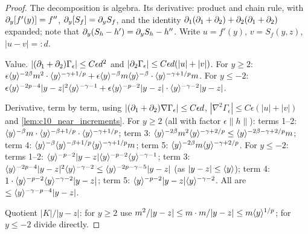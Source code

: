 \begin{proof}
  The decomposition is algebra. Its derivative: product and chain rule, with $\partial_y[f'(y)]=f''$,
  $\partial_y[S_f]=\partial_yS_f$, and the identity $\partial_1(\partial_1+\partial_2)+\partial_2(\partial_1+\partial_2)$ expanded; note that
  $\partial_y(S_h-h')=\partial_yS_h-h''$. Write $u=f'(y)$, $v=S_f(y,z)$, $|u-v|=:d$.

  Value. $|(\partial_1+\partial_2)\Gamma_\epsilon|\le C\epsilon d^2$ and $|\partial_2\Gamma_\epsilon|\le C\epsilon d(|u|+|v|)$. For
  $y\ge2$: $\epsilon\langle y \rangle^{-2\beta}m^2\cdot\langle y \rangle^{-\gamma+1/p}+\epsilon\langle y \rangle^{-\beta}m\langle y \rangle^{-\beta}\cdot
  \langle y \rangle^{-\gamma+1/p}m$. For $y\le-2$: $\epsilon\langle y \rangle^{-2p-4}|y-z|^2\langle y \rangle^{-\gamma-1}+\epsilon
  \langle y \rangle^{-p-2}|y-z|\cdot\langle y \rangle^{-\gamma-2}|y-z|$.

  Derivative, term by term, using $|(\partial_1+\partial_2)\nabla\Gamma_\epsilon|\le C\epsilon d$,
  $|\nabla^2\Gamma_\epsilon|\le C\epsilon(|u|+|v|)$ and \cref{lem:c10_near_increments}. For $y\ge2$ (all with
  factor $\epsilon\|h\|$): terms 1--2: $\langle y \rangle^{-\beta}m\cdot\langle y \rangle^{-\beta+1/p}\cdot\langle y \rangle^{-\gamma+1/p}$;
  term 3: $\langle y \rangle^{-2\beta}m^2\langle y \rangle^{-\gamma+2/p}\le\langle y \rangle^{-2\beta-\gamma+2/p}m$; term 4:
  $\langle y \rangle^{-\beta}\langle y \rangle^{-\beta+1/p}\langle y \rangle^{-\gamma+1/p}m$; term 5:
  $\langle y \rangle^{-2\beta}m\langle y \rangle^{-\gamma+2/p}$. For $y\le-2$: terms 1--2:
  $\langle y \rangle^{-p-2}|y-z|\langle y \rangle^{-p-2}\langle y \rangle^{-\gamma-1}$; term 3: $\langle y \rangle^{-2p-4}|y-z|^2\langle y \rangle^{-\gamma-2}
  \le\langle y \rangle^{-2p-\gamma-5}|y-z|$ (as $|y-z|\le\langle y \rangle$); term 4: $1\cdot\langle y \rangle^{-p-2}\langle y \rangle^{-\gamma-2}|y-z|$;
  term 5: $\langle y \rangle^{-p-2}|y-z|\langle y \rangle^{-\gamma-2}$. All are $\le\langle y \rangle^{-\gamma-p-4}|y-z|$.

  Quotient $|K|/|y-z|$: for $y\ge2$ use $m^2/|y-z|\le m\cdot m/|y-z|\le m\langle y \rangle^{1/p}$; for $y\le-2$ divide directly.
\end{proof}

